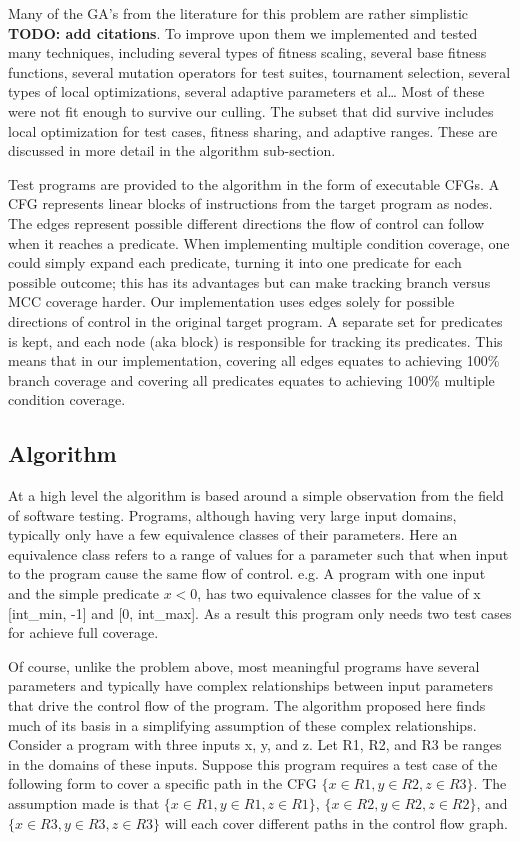 \documentclass[runningheads]{llncs}
\begin{document}
Many of the GA’s from the literature for this problem are rather simplistic \textbf{TODO: add citations}. To improve upon them we implemented and tested many techniques, including several types of fitness scaling, several base fitness functions, several mutation operators for test suites, tournament selection, several types of local optimizations, several adaptive parameters et al… Most of these were not fit enough to survive our culling. The subset that did survive includes local optimization for test cases, fitness sharing, and adaptive ranges. These are discussed in more detail in the algorithm sub-section.

Test programs are provided to the algorithm in the form of executable CFGs. A CFG represents linear blocks of instructions from the target program as nodes. The edges represent possible different directions the flow of control can follow when it reaches a predicate.  When implementing multiple condition coverage, one could simply expand each predicate, turning it into one predicate for each possible outcome; this has its advantages but can make tracking branch versus MCC coverage harder. Our implementation uses edges solely for possible directions of control in the original target program. A separate set for predicates is kept, and each node (aka block) is responsible for tracking its predicates. This means that in our implementation, covering all edges equates to achieving 100\% branch coverage and covering all predicates equates to achieving 100\% multiple condition coverage. 

\subsection{Algorithm}\label{sec:Alg}
At a high level the algorithm is based around a simple observation from the field of software testing. Programs, although having very large input domains, typically only have a few equivalence classes of their parameters. Here an equivalence class refers to a range of values for a parameter such that when input to the program cause the same flow of control. e.g. A program with one input and the simple predicate $ x < 0$, has two equivalence classes for the value of x [int\_min, -1] and [0, int\_max]. As a result this program only needs two test cases for achieve full coverage.

Of course, unlike the problem above, most meaningful programs have several parameters and typically have complex relationships between input parameters that drive the control flow of the program. The algorithm proposed here finds much of its basis in a simplifying assumption of these complex relationships. Consider a program with three inputs x, y, and z. Let R1, R2, and R3 be ranges in the domains of these inputs. Suppose this program requires a test case of the following form to cover a specific path in the CFG $\{ x \in R1, y \in R2, z \in R3 \}$. The assumption made is that $\{ x \in R1, y \in R1, z \in R1 \}$, $\{ x \in R2, y \in R2, z \in R2 \}$, and $\{ x \in R3, y \in R3, z \in R3 \}$ will each cover different paths in the control flow graph. 
\end{document}
